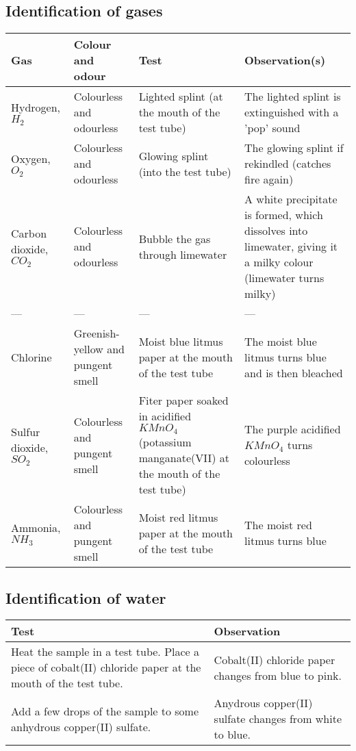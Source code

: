 \documentclass[11pt]{article}
\begin{document}
\subsection{Identification of gases}
\label{sec:org5a34f60}
\begin{center}
\begin{tabular}{llll}
Gas & Colour and odour & Test & Observation(s)\\
\hline
Hydrogen, \(H_2\) & Colourless and odourless & Lighted splint (at the mouth of the test tube) & The lighted splint is extinguished with a 'pop' sound\\
Oxygen, \(O_2\) & Colourless and odourless & Glowing splint (into the test tube) & The glowing splint if rekindled (catches fire again)\\
Carbon dioxide, \(CO_2\) & Colourless and odourless & Bubble the gas through limewater & A white precipitate is formed, which dissolves into limewater, giving it a milky colour (limewater turns milky)\\
--- & --- & --- & ---\\
Chlorine & Greenish-yellow and pungent smell & Moist blue litmus paper at the mouth of the test tube & The moist blue litmus turns blue and is then bleached\\
Sulfur dioxide, \(SO_2\) & Colourless and pungent smell & Fiter paper soaked in acidified \(KMnO_4\) (potassium manganate(VII) at the mouth of the test tube) & The purple acidified \(KMnO_4\) turns colourless\\
Ammonia, \(NH_3\) & Colourless and pungent smell & Moist red litmus paper at the mouth of the test tube & The moist red litmus turns blue\\
\end{tabular}
\end{center}
\subsection{Identification of water}
\label{sec:orgb5c8f72}
\begin{center}
\begin{tabular}{ll}
Test & Observation\\
\hline
Heat the sample in a test tube. Place a piece of cobalt(II) chloride paper at the mouth of the test tube. & Cobalt(II) chloride paper changes from blue to pink.\\
Add a few drops of the sample to some anhydrous copper(II) sulfate. & Anydrous copper(II) sulfate changes from white to blue.\\
\end{tabular}
\end{center}
\end{document}
